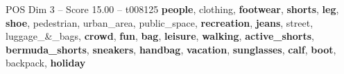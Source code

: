 \begin{textsample}{POS Dim 3 – Score 15.00 – t008125}  \label{ex:f3_pos_027}
\textbf{people}, clothing, \textbf{footwear}, \textbf{shorts}, \textbf{leg}, \textbf{shoe}, pedestrian, urban\_area, public\_space, \textbf{recreation}, \textbf{jeans}, street, luggage\_\&\_bags, \textbf{crowd}, \textbf{fun}, \textbf{bag}, \textbf{leisure}, \textbf{walking}, \textbf{active\_shorts}, \textbf{bermuda\_shorts}, \textbf{sneakers}, \textbf{handbag}, \textbf{vacation}, \textbf{sunglasses}, \textbf{calf}, \textbf{boot}, backpack, \textbf{holiday}

\end{textsample}

